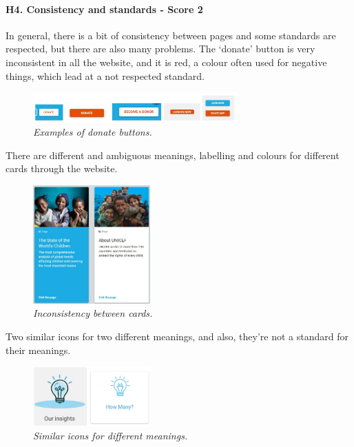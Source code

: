 \paragraph{H4. Consistency and standards - Score 2}	In general, there is a bit of consistency between pages and some standards are respected, but there are also many problems.
\newline The ‘donate’ button is very inconsistent in all the website, and it is red, a colour often used for negative things, which lead at a not respected standard.
\begin{figure}[!h]
	\begin{center}
		\includegraphics[width=0.7\textwidth]{FinalScores8.jpg}
		\captionsetup{font=small}
		\caption{\textit{Examples of donate buttons.}}
	\end{center}
\end{figure}
\newline There are different and ambiguous meanings, labelling and colours for different cards through the website.
\begin{figure}[!h]
	\begin{center}
		\includegraphics[width=0.4\textwidth]{FinalScores9.jpg}
		\captionsetup{font=small}
		\caption{\textit{Inconsistency between cards.}}
	\end{center}
\end{figure}
\newline Two similar icons for two different meanings, and also, they’re not a standard for their meanings.
\begin{figure}[!h]
	\begin{center}
		\includegraphics[width=0.4\textwidth]{FinalScores10.jpg}
		\captionsetup{font=small}
		\caption{\textit{Similar icons for different meanings.}}
	\end{center}
\end{figure}
